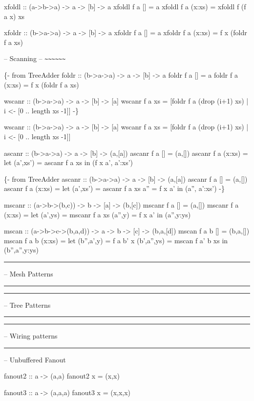 \documentclass[]{svmono}
\begin{document}
xfoldl :: (a->b->a) -> a -> [b] -> a
xfoldl f a [] = a
xfoldl f a (x:xs) = xfoldl f (f a x) xs

xfoldr :: (b->a->a) -> a -> [b] -> a
xfoldr f a [] = a
xfoldr f a (x:xs) = f x (foldr f a xs)

-- Scanning
-- \texttt{\textasciitilde{}\textasciitilde{}\textasciitilde{}\textasciitilde{}\textasciitilde{}\textasciitilde{}}

\{- from TreeAdder
foldr :: (b->a->a) -> a -> [b] -> a
foldr f a [] = a
foldr f a (x:xs) = f x (foldr f a xs)

wscanr :: (b->a->a) -> a -> [b] -> [a]
wscanr f a xs =
  {[}foldr f a (drop (i+1) xs) | i <- [0 .. length xs -1]]
-\}



wscanr :: (b->a->a) -> a -> [b] -> [a]
wscanr f a xs =
  {[}foldr f a (drop (i+1) xs) | i <- [0 .. length xs -1]]

ascanr :: (b->a->a) -> a -> [b] -> (a,[a])
ascanr f a [] = (a,[])
ascanr f a (x:xs) =
  let (a',xs') = ascanr f a xs
  in (f x a', a':xs')

\{- from TreeAdder
ascanr ::  (b->a->a) -> a -> [b] -> (a,[a])
ascanr f a [] = (a,[])
ascanr f a (x:xs) =
  let (a',xs') = ascanr f a xs
      a'' = f x a'
  in (a'', a':xs')
-\}


mscanr :: (a->b->(b,c)) -> b -> [a] -> (b,[c])
mscanr f a [] = (a,[])
mscanr f a (x:xs) =
  let (a',ys) = mscanr f a xs
      (a'',y) = f x a'
  in (a'',y:ys)

mscan :: (a->b->c->(b,a,d)) -> a -> b -> [c] -> (b,a,[d])
mscan f a b [] = (b,a,[])
mscan f a b (x:xs) =
  let (b'',a',y) = f a b' x
      (b',a'',ys) = mscan f a' b xs
  in (b'',a'',y:ys)



\noindent\rule{\textwidth}{0.5pt}
--			    Mesh Patterns

\noindent\rule{\textwidth}{0.5pt}



\noindent\rule{\textwidth}{0.5pt}
--			    Tree Patterns

\noindent\rule{\textwidth}{0.5pt}



\noindent\rule{\textwidth}{0.5pt}
--			   Wiring patterns

\noindent\rule{\textwidth}{0.5pt}


-- Unbuffered Fanout

fanout2 :: a -> (a,a)
fanout2 x = (x,x)

fanout3 :: a -> (a,a,a)
fanout3 x = (x,x,x)
\end{document}
